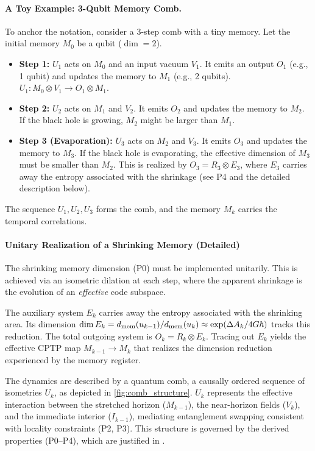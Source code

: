 \documentclass[a4paper,11pt]{article}
\newcommand{\eg}{e.g.\xspace}
\theoremstyle{plain}
\theoremstyle{definition}
\theoremstyle{remark}
\begin{document}
\paragraph{A Toy Example: 3-Qubit Memory Comb.}
To anchor the notation, consider a 3-step comb with a tiny memory. Let the initial memory $M_0$ be a qubit ($\dim=2$).
\begin{itemize}
    \item \textbf{Step 1:} $U_1$ acts on $M_0$ and an input vacuum $V_1$. It emits an output $O_1$ (\eg, 1 qubit) and updates the memory to $M_1$ (\eg, 2 qubits). $U_1: M_0 \otimes V_1 \to O_1 \otimes M_1$.
    \item \textbf{Step 2:} $U_2$ acts on $M_1$ and $V_2$. It emits $O_2$ and updates the memory to $M_2$. If the black hole is growing, $M_2$ might be larger than $M_1$.
    \item \textbf{Step 3 (Evaporation):} $U_3$ acts on $M_2$ and $V_3$. It emits $O_3$ and updates the memory to $M_3$. If the black hole is evaporating, the effective dimension of $M_3$ must be smaller than $M_2$. This is realized by $O_3 = R_3 \otimes E_3$, where $E_3$ carries away the entropy associated with the shrinkage (see P4 and the detailed description below).
\end{itemize}
The sequence $U_1, U_2, U_3$ forms the comb, and the memory $M_k$ carries the temporal correlations.

\paragraph{Unitary Realization of a Shrinking Memory (Detailed)}
The shrinking memory dimension (P0) must be implemented unitarily. This is achieved via an isometric dilation at each step, where the apparent shrinkage is the evolution of an \emph{effective} code subspace.

The auxiliary system $E_k$ carries away the entropy associated with the shrinking area. Its dimension $\dim E_k = d_{\rm mem}(u_{k-1}) / d_{\rm mem}(u_k) \approx \exp(\Delta A_k / 4G\hbar)$ tracks this reduction. The total outgoing system is $O_k = R_k \otimes E_k$. Tracing out $E_k$ yields the effective CPTP map $M_{k-1}\!\to\!M_k$ that realizes the dimension reduction experienced by the memory register.

The dynamics are described by a quantum comb, a causally ordered sequence of isometries $U_k$, as depicted in \cref{fig:comb_structure}. $U_k$ represents the effective interaction between the stretched horizon ($M_{k-1}$), the near-horizon fields ($V_k$), and the immediate interior ($I_{k-1}$), mediating entanglement swapping consistent with locality constraints (P2, P3). This structure is governed by the derived properties (P0--P4), which are justified in .
\end{document}
